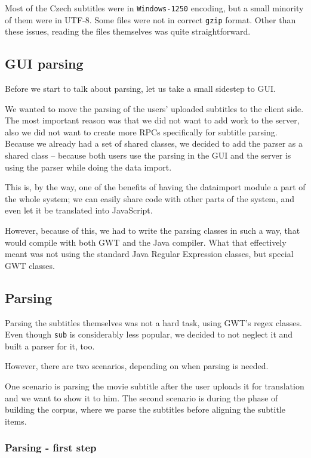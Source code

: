 Most of the Czech subtitles were in \texttt{Windows-1250} encoding, but a small minority of them were in UTF-8. Some files were not in correct \texttt{gzip} format. Other than these issues, reading the files themselves was quite straightforward.

\subsection*{GUI parsing}
Before we start to talk about parsing, let us take a small sidestep to GUI.

We wanted to move the parsing of the users' uploaded subtitles to the client side. The most important reason was that we did not want to add work to the server, also we did not want to create more RPCs specifically for subtitle parsing.  Because we already had a set of shared classes, we decided to add the parser as a shared class -- because both users use the parsing in the GUI and the server is using the parser while doing the data import.

This is, by the way, one of the benefits of having the dataimport module a part of the whole system; we can easily share code with other parts of the system, and even let it be translated into JavaScript.

However, because of this, we had to write the parsing classes in such a way, that would compile with both GWT and the Java compiler. What that effectively meant was not using the standard Java Regular Expression classes, but special GWT classes.

\subsection*{Parsing}
Parsing the subtitles themselves was not a hard task, using GWT's regex classes. Even though \texttt{sub} is considerably less popular, we decided to not neglect it and built a parser for it, too.

However, there are two scenarios, depending on when parsing is needed.

One scenario is parsing the movie subtitle after the user uploads it for translation and we want to show it to him. The second scenario is during the phase of building the corpus, where we parse the subtitles before aligning the subtitle items.

\subsubsection*{Parsing - first step}

